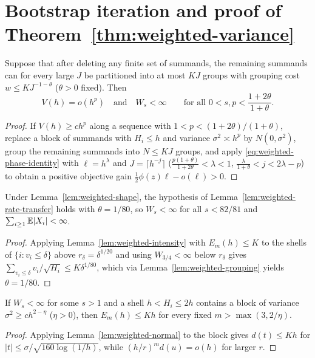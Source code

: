 \section{Bootstrap iteration and proof of Theorem~\ref{thm:weighted-variance}}
\label{sec:weighted-iteration}

\begin{lemma}
\label{lem:weighted-rate-transfer}
Suppose that after deleting any finite set of summands, the remaining
summands can for every large $J$ be partitioned into at most $KJ$ groups with
grouping cost $w\le KJ^{-1-\theta}$ ($\theta>0$ fixed). Then
\[
 V(h)=o(h^p)\quad\text{and}\quad W_s<\infty
 \qquad\text{for all }0<s,p<\frac{1+2\theta}{1+\theta}.
\]
\end{lemma}
\begin{proof}
If $V(h)\ge ch^p$ along a sequence with $1<p<(1+2\theta)/(1+\theta)$, replace
a block of summands with $H_i\le h$ and variance $\sigma^2\asymp h^p$ by
$N(0,\sigma^2)$, group the remaining summands into $N\le KJ$ groups, and
apply \eqref{eq:weighted-phase-identity} with $\ell=h^\lambda$ and
$J=\lceil h^{-j}\rceil$ ($\frac{p(1+\theta)}{1+2\theta}<\lambda<1$,
$\frac{\lambda}{1+\theta}<j<2\lambda-p$) to obtain a positive objective gain
$\frac12\phi(z)\ell-o(\ell)>0$.
\end{proof}

\begin{lemma}\label{lem:weighted-initial-rate}
Under Lemma~\ref{lem:weighted-shape}, the hypothesis of
Lemma~\ref{lem:weighted-rate-transfer} holds with $\theta=1/80$, so
$W_s<\infty$ for all $s<82/81$ and $\sum_{i\ge1}\mathbb E|X_i|<\infty$.
\end{lemma}
\begin{proof}
Applying Lemma~\ref{lem:weighted-intensity} with $E_m(h)\le K$ to the shells
of $\{i:v_i\le\delta\}$ above $r_\delta=\delta^{1/20}$ and using $W_{3/4}<\infty$
below $r_\delta$ gives $\sum_{v_i\le\delta}v_i/\sqrt{H_i}\le K\delta^{1/80}$,
which via Lemma~\ref{lem:weighted-grouping} yields $\theta=1/80$.
\end{proof}

\begin{lemma}\label{lem:weighted-rich-shell}
If $W_s<\infty$ for some $s>1$ and a shell $h<H_i\le2h$ contains a block of
variance $\sigma^2\ge ch^{2-\eta}$ ($\eta>0$), then $E_m(h)\le Kh$ for every
fixed $m>\max(3,2/\eta)$.
\end{lemma}
\begin{proof}
Applying Lemma~\ref{lem:weighted-normal} to the block gives $d(t)\le Kh$ for
$|t|\le\sigma/\sqrt{160\log(1/h)}$, while $(h/r)^md(u)=o(h)$ for larger $r$.
\end{proof}

